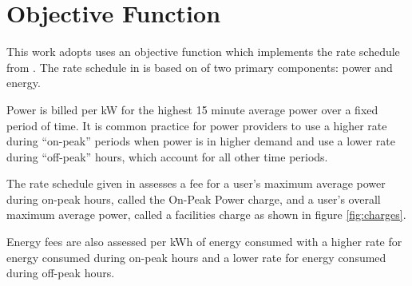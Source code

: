\section{Objective Function\label{sec:objective}}
This work adopts uses an objective function which implements the rate schedule from \cite{rocky_mountain_power_rocky_2021}. The rate schedule in \cite{rocky_mountain_power_rocky_2021} is based on of two primary components: power and energy.  
\par Power is billed per kW for the highest 15 minute average power over a fixed period of time. It is common practice for power providers to use a higher rate during ``on-peak'' periods when power is in higher demand and use a lower rate during ``off-peak'' hours, which account for all other time periods. 
\par The rate schedule given in \cite{rocky_mountain_power_rocky_2021} assesses a fee for a user's maximum average power during on-peak hours, called the On-Peak Power charge, and a user's overall maximum average power, called a facilities charge as shown in figure \ref{fig:charges}. 
\par Energy fees are also assessed per kWh of energy consumed with a higher rate for energy consumed during on-peak hours and a lower rate for energy consumed during off-peak hours.

